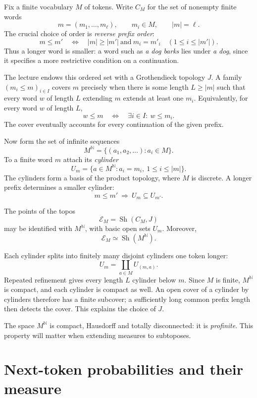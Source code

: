 Fix a finite vocabulary \(M\) of tokens. Write \(C_M\) for the set of nonempty finite words
\[
 m=(m_1,\ldots,m_\ell),\qquad m_i\in M,\qquad |m|=\ell.
\]
The crucial choice of order is \emph{reverse prefix order}:
\[
 m\leq m'
 \quad\Longleftrightarrow\quad
 |m|\geq|m'|\ \text{and}\ m_i=m'_i\quad (1\leq i\leq |m'|).
\]
Thus a longer word is smaller: a word such as \emph{a dog barks} lies under \emph{a dog}, since it specifies a more restrictive condition on a continuation.

The lecture endows this ordered set with a Grothendieck topology \(J\). A family \((m_i\leq m)_{i\in I}\) covers \(m\) precisely when there is some length \(L\geq|m|\) such that every word \(w\) of length \(L\) extending \(m\) extends at least one \(m_i\). Equivalently, for every word \(w\) of length \(L\),
\[
 w\leq m\quad\Longleftrightarrow\quad
 \exists i\in I:\ w\leq m_i.
\]
The cover eventually accounts for every continuation of the given prefix.

Now form the set of infinite sequences
\[
 M^{\mathbb N}=\{(a_1,a_2,\ldots):a_i\in M\}.
\]
To a finite word \(m\) attach its \emph{cylinder}
\[
 U_m=\{a\in M^{\mathbb N}:a_i=m_i,\ 1\leq i\leq|m|\}.
\]
The cylinders form a basis of the product topology, where \(M\) is discrete. A longer prefix determines a smaller cylinder:
\[
 m\leq m'\ \Longrightarrow\ U_m\subseteq U_{m'}.
\]

\begin{proposition}
The points of the topos
\[
 \mathcal E_M=\operatorname{Sh}(C_M,J)
\]
may be identified with \(M^{\mathbb N}\), with basic open sets \(U_m\). Moreover,
\[
 \mathcal E_M\simeq\operatorname{Sh}(M^{\mathbb N}).
\]
\end{proposition}

Each cylinder splits into finitely many disjoint cylinders one token longer:
\[
 U_m=\coprod_{a\in M}U_{(m,a)}.
\]
Repeated refinement gives every length \(L\) cylinder below \(m\). Since \(M\) is finite, \(M^{\mathbb N}\) is compact, and each cylinder is compact as well. An open cover of a cylinder by cylinders therefore has a finite subcover; a sufficiently long common prefix length then detects the cover. This explains the choice of \(J\).

The space \(M^{\mathbb N}\) is compact, Hausdorff and totally disconnected: it is \emph{profinite}. This property will matter when extending measures to subtoposes.

\section{Next-token probabilities and their measure}

